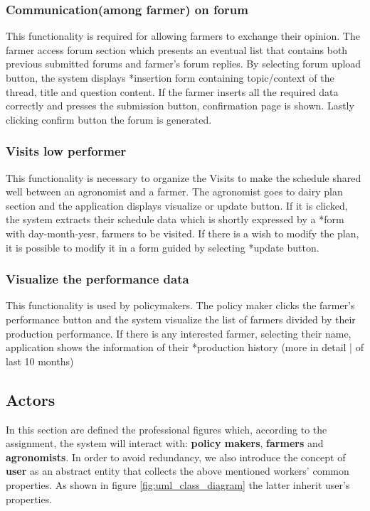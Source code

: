 \subsubsection{Communication(among farmer) on forum}
This functionality is required for allowing farmers to exchange their opinion. The farmer 
access forum section which presents an eventual list that contains both previous submitted 
forums and farmer’s forum replies. By selecting forum upload button, the system displays 
*insertion form containing topic/context of the thread, title and question content. If the farmer 
inserts all the required data correctly and presses the submission button, confirmation page 
is shown. Lastly clicking confirm button the forum is generated.   
\subsubsection{Visits low performer}
This functionality is necessary to organize the Visits to make the schedule shared well 
between an agronomist and a farmer. The agronomist goes to dairy plan section and the 
application displays visualize or update button. If it is clicked, the system extracts their schedule
data which is shortly expressed by a *form with day-month-yesr, farmers to be visited.
If there is a wish to modify the plan, it is possible to modify it in a form guided by selecting 
*update button.
\subsubsection{Visualize the performance data}
This functionality is used by policymakers. The policy maker clicks the farmer's performance 
button and the system visualize the list of farmers divided by their production performance. If 
there is any interested farmer, selecting their name, application shows the information of their
*production history (more in detail | of last 10 months) 

\subsection{Actors}
In this section are defined the professional figures which, according to the assignment, the system will interact with: \textbf{policy makers}, \textbf{farmers} and \textbf{agronomists}. In order to avoid redundancy, we also introduce the concept of \textbf{user} as an abstract entity that collects the above mentioned workers' common properties. As shown in figure \ref{fig:uml_class_diagram} the latter inherit user's properties.
